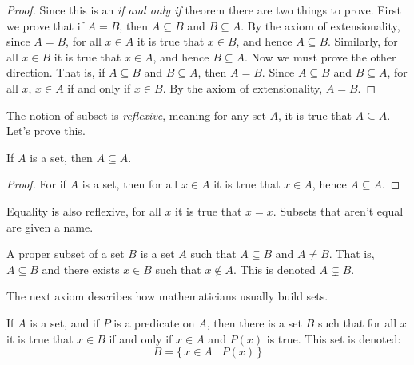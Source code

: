             \begin{proof}
                Since this is an \textit{if and only if} theorem there are two
                things to prove. First we prove that if $A=B$, then
                $A\subseteq{B}$ and $B\subseteq{A}$. By the axiom of
                extensionality, since $A=B$,
                for all $x\in{A}$ it is true that $x\in{B}$, and hence
                $A\subseteq{B}$. Similarly, for all $x\in{B}$ it is true that
                $x\in{A}$, and hence $B\subseteq{A}$. Now we must prove the
                other direction. That is, if $A\subseteq{B}$ and
                $B\subseteq{A}$, then $A=B$. Since $A\subseteq{B}$ and
                $B\subseteq{A}$, for all $x$, $x\in{A}$ if and only if
                $x\in{B}$. By the axiom of extensionality, $A=B$.
            \end{proof}
            The notion of subset is \textit{reflexive}, meaning for any set
            $A$, it is true that $A\subseteq{A}$. Let's prove this.
            \begin{theorem}
                If $A$ is a set, then $A\subseteq{A}$.
            \end{theorem}
            \begin{proof}
                For if $A$ is a set, then for all $x\in{A}$ it is true that
                $x\in{A}$, hence $A\subseteq{A}$.
            \end{proof}
            Equality is also reflexive, for all $x$ it is true that $x=x$.
            Subsets that aren't equal are given a name.
            \begin{definition}
                A proper subset of a set $B$ is a set $A$ such that
                $A\subseteq{B}$ and $A\ne{B}$. That is, $A\subseteq{B}$ and
                there exists $x\in{B}$ such that $x\notin{A}$. This is denoted
                $A\subsetneq{B}$.
            \end{definition}
            The next axiom describes how mathematicians usually build sets.
            \begin{axiom}
                If $A$ is a set, and if $P$ is a predicate on $A$, then there
                is a set $B$ such that for all $x$ it is true that $x\in{B}$ if
                and only if $x\in{A}$ and $P(x)$ is true. This set is denoted:
                \begin{equation}
                    B=\{\,x\in{A}\;|\;P(x)\,\}
                \end{equation}
            \end{axiom}
